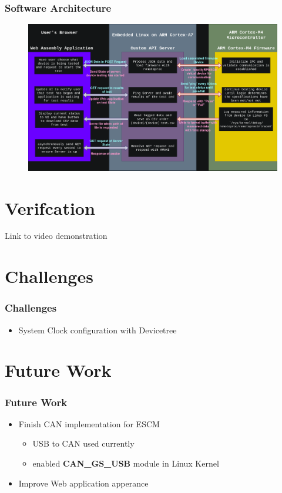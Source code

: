 \documentclass[8pt,compress]{beamer}
\newcommand\DarkBoldP[1]{\textcolor{VSPurpleDark}{\textbf{#1}}}
\begin{document}
\begin{frame}
  \frametitle{Software Architecture}
  \begin{figure}
    \includegraphics[width=\textwidth]{assets/diagrams/software_stack.drawio.png}
  \end{figure}
\end{frame}

\section{Verifcation}
\begin{frame}
  \begin{block}{Link to video demonstration}
    \href{https://dylxndy.xyz/senior-design-presentation/verification}
    {}
  \end{block}
\end{frame}

\section{Challenges}
\begin{frame}
  \frametitle{Challenges}
  \begin{itemize}
    \item System Clock configuration with Devicetree
  \end{itemize}
\end{frame}

\section{Future Work}
\begin{frame}
  \frametitle{Future Work}
  \begin{itemize}
    \item Finish CAN implementation for ESCM
      \begin{itemize}
        \item USB to CAN used currently
        \item enabled \DarkBoldP{CAN\_GS\_USB} module in Linux Kernel
      \end{itemize}
    \item Improve Web application apperance
  \end{itemize}

\end{frame}
\end{document}
